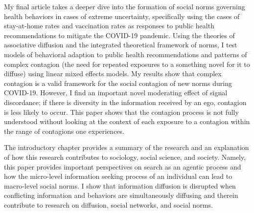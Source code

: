 My final article takes a deeper dive into the formation of social norms
governing health behaviors in cases of extreme uncertainty, specifically using the cases of
 stay-at-home rates and vaccination rates as responses to public health
recommendations to mitigate the COVID-19 pandemic. Using the theories of associative diffusion
and the integrated theoretical framework of norms, I test models of behavioral adaption
to public health recommendations and patterns of complex contagion (the need for
repeated exposures to a something novel for it to diffuse) using linear
mixed effects models. My results show that complex contagion is a valid 
framework for the social contagion of new norms during COVID-19. 
However, I find an important novel moderating effect of signal discordance; 
if there is diversity in the information received by an ego, 
contagion is less likely to occur. This paper shows that
the contagion process is not fully understood without looking at the context
of each exposure to a contagion within the range of contagions one experiences. 

The introductory chapter provides a summary of the research and an explanation of how this
research contributes to sociology, social science, and society. Namely, 
this paper provides important perspectives on search as an agentic process
and how the micro-level information seeking process of an individual can
lead to macro-level social norms. I show that information diffusion
is disrupted when conflicting information and behaviors are simultaneously
diffusing and therein contribute to research on diffusion, social networks,
and social norms. 


